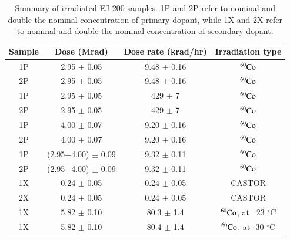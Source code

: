 \documentclass[review]{elsarticle}
\begin{document}
\begin{table}[!ht]
\centering
  \caption{Summary of irradiated EJ-200 samples. 
1P and 2P refer to nominal and double the nominal concentration of primary dopant, 
while 1X and 2X refer to nominal and double the nominal concentration of secondary dopant.}
  \begin{tabular}{c|c|c|c}
    \hline
    Sample          & Dose (Mrad)  		& Dose rate (krad/hr)    & Irradiation type  \\ \hline 
    1P 		    & 2.95 $\pm$ 0.05 		& 9.48 $\pm$ 0.16   	 & $\rm {^{60}Co}$  \\ 
    2P 		    & 2.95 $\pm$ 0.05		& 9.48 $\pm$ 0.16  	 & $\rm {^{60}Co}$	\\ \hline
    1P		    & 2.95 $\pm$ 0.05 		& 429 $\pm$ 7		 & $\rm {^{60}Co}$	\\ 
    2P		    & 2.95 $\pm$ 0.05 		& 429 $\pm$ 7		 & $\rm {^{60}Co}$	\\ \hline
    1P 		    & 4.00 $\pm$ 0.07		& 9.20 $\pm$ 0.16   	 & $\rm {^{60}Co}$	\\ 
    2P 		    & 4.00 $\pm$ 0.07		& 9.20 $\pm$ 0.16  	 & $\rm {^{60}Co}$	\\ \hline
    1P		    & (2.95+4.00) $\pm$ 0.09	& 9.32 $\pm$ 0.11	 & $\rm {^{60}Co}$	\\ 
    2P		    & (2.95+4.00) $\pm$ 0.09	& 9.32 $\pm$ 0.11	 & $\rm {^{60}Co}$	\\ \hline
    1X 		    & 0.24 $\pm$ 0.05		& 0.24 $\pm$ 0.05   	 & CASTOR	\\ 
    2X 		    & 0.24 $\pm$ 0.05		& 0.24 $\pm$ 0.05  	 & CASTOR 	\\ \hline
    1X		    & 5.82 $\pm$ 0.10		& 80.3 $\pm$ 1.4	 & $\rm {^{60}Co}$, at ~23 $^\circ$C\\ 
    1X		    & 5.82 $\pm$ 0.10		& 80.4 $\pm$ 1.4	 & $\rm {^{60}Co}$, at -30 $^\circ$C\\
    \hline
  \end{tabular}
  \label{table:samples}
\end{table}
\end{document}
